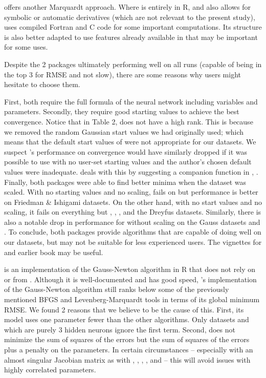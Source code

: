  \citep{minpack.lm} offers another Marquardt
approach. Where  is entirely in \textsf{R}, and also
allows for symbolic or automatic derivatives (which are not relevant to
the present study),  uses compiled \textsf{Fortran}
and \textsf{C} code for some important computations. Its structure is
also better adapted to use features already available in  that
may be important for some uses.

Despite the 2 packages ultimately performing well on all runs (capable
of being in the top 3 for RMSE and not slow), there are some reasons why
users might hesitate to choose them.

First, both require the full formula of the neural network including
variables and parameters. Secondly, they require good starting values to
achieve the best convergence. Notice that in Table 2, 
does not have a high rank. This is because we removed the random
Gaussian start values we had originally used; which means that the
default start values of  were not appropriate for our
datasets. We suspect 's performance on convergence would
have similarly dropped if it was possible to use  with no
user-set starting values and the author's chosen default values were
inadequate.  deals with this by suggesting a companion
function in , . Finally, both packages
were able to find better minima when the dataset was scaled. With no
starting values and no scaling,  fails on
 but performance is better on Friedman \& Ishigami
datasets. On the other hand, with no start values and no scaling, it
fails on everything but , ,
, and the Dreyfus datasets. Similarly, there is also a
notable drop in performance for  without scaling on the
Gauss datasets and . To conclude, both packages provide
algorithms that are capable of doing well on our datasets, but may not
be suitable for less experienced users. The vignettes for 
and earlier book \citep{Nash-nlpor14} may be useful.

 \citep{R-brnn} is an implementation of the Gauss-Newton
algorithm in \textsf{R} that does not rely on  or 
from . Although it is well-documented and has good speed,
's implementation of the Gauss-Newton algorithm still
ranks below some of the previously mentioned BFGS and
Levenberg-Marquardt tools in terms of its global minimum RMSE. We found
2 reasons that we believe to be the cause of this. First, its model uses
one parameter fewer than the other algorithms. Only datasets
 and  which are purely 3 hidden neurons
ignore the first term. Second,  does not minimize the sum
of squares of the errors but the sum of squares of the errors plus a
penalty on the parameters. In certain circumstances -- especially with
an almost singular Jacobian matrix as with ,
, , , and 
-- this will avoid issues with highly correlated parameters.

